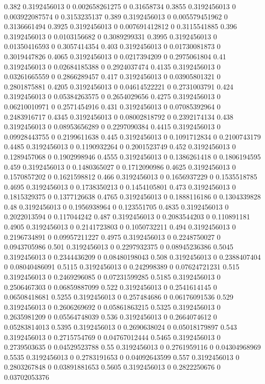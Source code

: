 {0.382 0.3192456013 0 0.002658261275 0 0.31658734
0.3855 0.3192456013 0 0.003922087574 0 0.3153235137
0.389 0.3192456013 0 0.005579451962 0 0.3136661494
0.3925 0.3192456013 0 0.007691412812 0 0.3115541885
0.396 0.3192456013 0 0.0103156682 0 0.3089299331
0.3995 0.3192456013 0 0.01350416593 0 0.3057414354
0.403 0.3192456013 0 0.01730081873 0 0.3019447826
0.4065 0.3192456013 0 0.0217394209 0 0.2975061804
0.41 0.3192456013 0 0.02684185388 0 0.2924037474
0.4135 0.3192456013 0 0.03261665559 0 0.2866289457
0.417 0.3192456013 0 0.03905801321 0 0.2801875881
0.4205 0.3192456013 0 0.04614522221 0 0.2731003791
0.424 0.3192456013 0 0.05384263575 0 0.2654029656
0.4275 0.3192456013 0 0.06210010971 0 0.2571454916
0.431 0.3192456013 0 0.07085392964 0 0.2483916717
0.4345 0.3192456013 0 0.08002818792 0 0.2392174134
0.438 0.3192456013 0 0.08953656289 0 0.2297090384
0.4415 0.3192456013 0 0.09928443755 0 0.2199611638
0.445 0.3192456013 0 0.1091712834 0 0.2100743179
0.4485 0.3192456013 0 0.1190932264 0 0.2001523749
0.452 0.3192456013 0 0.1289457068 0 0.1902998946
0.4555 0.3192456013 0 0.1386261418 0 0.1806194595
0.459 0.3192456013 0 0.1480365027 0 0.1712090986
0.4625 0.3192456013 0 0.1570857202 0 0.1621598812
0.466 0.3192456013 0 0.1656937229 0 0.1535518785
0.4695 0.3192456013 0 0.1738350213 0 0.1454105801
0.473 0.3192456013 0 0.1815329375 0 0.1377126638
0.4765 0.3192456013 0 0.1888116186 0 0.1304339828
0.48 0.3192456013 0 0.1956938964 0 0.123551705
0.4835 0.3192456013 0 0.2022013594 0 0.117044242
0.487 0.3192456013 0 0.2083544203 0 0.110891181
0.4905 0.3192456013 0 0.2141723803 0 0.1050732211
0.494 0.3192456013 0 0.2196734891 0 0.09957211227
0.4975 0.3192456013 0 0.2248750027 0 0.0943705986
0.501 0.3192456013 0 0.2297932375 0 0.08945236386
0.5045 0.3192456013 0 0.2344436209 0 0.08480198043
0.508 0.3192456013 0 0.2388407404 0 0.08040486091
0.5115 0.3192456013 0 0.242998389 0 0.07624721231
0.515 0.3192456013 0 0.2469296085 0 0.07231599285
0.5185 0.3192456013 0 0.2506467303 0 0.06859887099
0.522 0.3192456013 0 0.2541614145 0 0.06508418681
0.5255 0.3192456013 0 0.257484686 0 0.06176091536
0.529 0.3192456013 0 0.2606269692 0 0.05861863215
0.5325 0.3192456013 0 0.2635981209 0 0.05564748039
0.536 0.3192456013 0 0.2664074612 0 0.05283814013
0.5395 0.3192456013 0 0.2690638024 0 0.05018179897
0.543 0.3192456013 0 0.2715754769 0 0.04767012444
0.5465 0.3192456013 0 0.2739503635 0 0.04529523788
0.55 0.3192456013 0 0.2761959116 0 0.04304968969
0.5535 0.3192456013 0 0.2783191653 0 0.04092643599
0.557 0.3192456013 0 0.2803267848 0 0.03891881653
0.5605 0.3192456013 0 0.2822250676 0 0.03702053376
}
